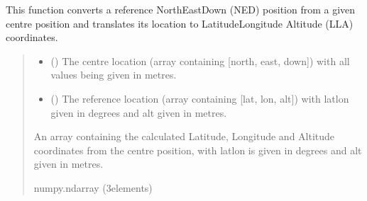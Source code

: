 \documentclass[letterpaper,10pt,english]{sphinxmanual}
\begin{document}

\begin{fulllineitems}
\label{\detokenize{modules/util/transformations:qnav.util.transformations.ned2lla}}
\pysigstartsignatures
{}
\pysigstopsignatures
\sphinxAtStartPar
This function converts a reference North\sphinxhyphen{}East\sphinxhyphen{}Down (NED) position from a
given centre position and translates its location to Latitude\sphinxhyphen{}Longitude\sphinxhyphen{}
Altitude (LLA) coordinates.
\begin{quote}\begin{description}
\begin{itemize}
\item {} 
\sphinxAtStartPar
{} (\sphinxstyleliteralemphasis{\sphinxupquote{ (}}\sphinxstyleliteralemphasis{\sphinxupquote{)}}) \textendash{} The centre location (array containing {[}north, east, down{]})
with all values being given in metres.

\item {} 
\sphinxAtStartPar
{} (\sphinxstyleliteralemphasis{\sphinxupquote{ (}}\sphinxstyleliteralemphasis{\sphinxupquote{)}}) \textendash{} The reference location (array containing {[}lat, lon, alt{]})
with lat\sphinxhyphen{}lon given in degrees and alt given in metres.

\end{itemize}

\sphinxAtStartPar
An array containing the calculated Latitude, Longitude and
Altitude coordinates from the centre position, with lat\sphinxhyphen{}lon is given
in degrees and alt given in metres.

\sphinxAtStartPar
numpy.ndarray (3\sphinxhyphen{}elements)

\end{description}\end{quote}

\end{fulllineitems}
\end{document}
